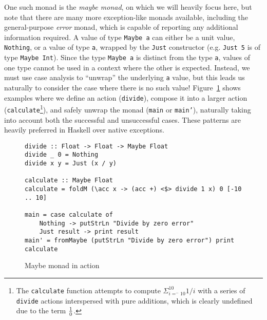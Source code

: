 \documentclass[11pt]{article}
\begin{document}
One such monad is the \emph{maybe monad}, on which we will heavily focus here, but note that there are many more exception-like monads available, including the general-purpose \emph{error} monad, which is capable of reporting any additional information required.
A value of type \texttt{Maybe a} can either be a unit value, \texttt{Nothing}, or a value of type \texttt{a}, wrapped by the \texttt{Just} constructor (e.g. \texttt{Just 5} is of type \texttt{Maybe Int}).
Since the type \texttt{Maybe a} is distinct from the type \texttt{a}, values of one type cannot be used in a context where the other is expected.
Instead, we must use case analysis to ``unwrap'' the underlying \texttt{a} value, but this leads us naturally to consider the case where there is no such value!
Figure~\ref{maybeMonad} shows examples where we define an action (\texttt{divide}), compose it into a larger action (\texttt{calculate}\footnote{The \texttt{calculate} function attempts to compute $\Sigma_{i=^-10}^{10}{1/i}$ with a series of \texttt{divide} actions interspersed with pure additions, which is clearly undefined due to the term $1\over0$.}), and safely unwrap the monad (\texttt{main} or \texttt{main'}), naturally taking into account both the successful and unsuccessful cases.
These patterns are heavily preferred in Haskell over native exceptions.

\begin{figure}[H]
\caption{Maybe monad in action}
\label{maybeMonad}
\begin{verbatim}
divide :: Float -> Float -> Maybe Float
divide _ 0 = Nothing
divide x y = Just (x / y)

calculate :: Maybe Float
calculate = foldM (\acc x -> (acc +) <$> divide 1 x) 0 [-10 .. 10]

main = case calculate of
    Nothing -> putStrLn "Divide by zero error"
    Just result -> print result
main' = fromMaybe (putStrLn "Divide by zero error") print calculate
\end{verbatim}
\end{figure}
\end{document}
